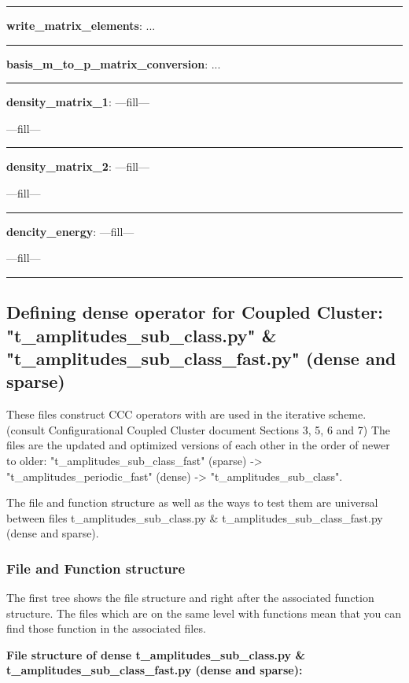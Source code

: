 \documentclass[a4paper,10pt]{article}
\begin{document}
\noindent\rule{\linewidth}{0.4pt}

\textbf{write\_matrix\_elements}: ...

\noindent\rule{\linewidth}{0.4pt}

\textbf{basis\_m\_to\_p\_matrix\_conversion}: ...

\noindent\rule{\linewidth}{0.4pt}

\textbf{density\_matrix\_1}: ---fill---

---fill---

\noindent\rule{\linewidth}{0.4pt}

\textbf{density\_matrix\_2}: ---fill---

---fill---

\noindent\rule{\linewidth}{0.4pt}

\textbf{dencity\_energy}: ---fill---

---fill---

\noindent\rule{\linewidth}{0.4pt}




\subsection{Defining dense operator for Coupled Cluster: "t\_amplitudes\_sub\_class.py" \& "t\_amplitudes\_sub\_class\_fast.py" (dense and sparse)}

These files construct CCC operators with are used in the iterative scheme.(consult Configurational Coupled Cluster document Sections 3, 5, 6 and 7) The files are the updated and optimized versions of each other in the order of newer to older: "t\_amplitudes\_sub\_class\_fast" (sparse) -> "t\_amplitudes\_periodic\_fast" (dense) -> "t\_amplitudes\_sub\_class".

The file and function structure as well as the ways to test them are universal between files t\_amplitudes\_sub\_class.py \& t\_amplitudes\_sub\_class\_fast.py (dense and sparse).



\subsubsection{File and Function structure}

The first tree shows the file structure and right after the associated function structure. The files which are on the same level with functions mean that you can find those function in the associated files.


\textbf{\newline File structure of dense t\_amplitudes\_sub\_class.py \& t\_amplitudes\_sub\_class\_fast.py (dense and sparse): \newline}
\end{document}
